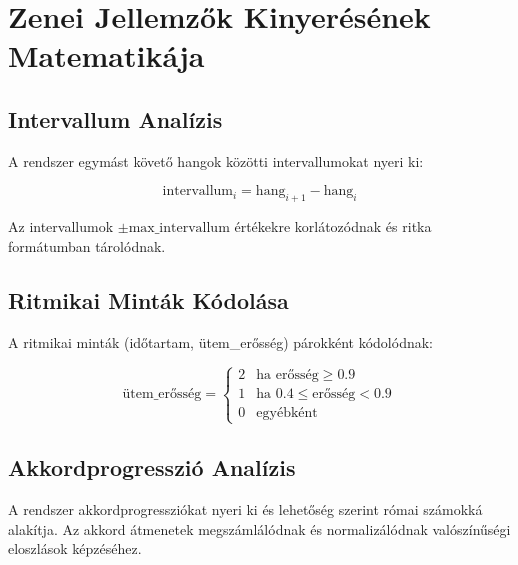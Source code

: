 \section{Zenei Jellemzők Kinyerésének Matematikája}

\subsection{Intervallum Analízis}

A rendszer egymást követő hangok közötti intervallumokat nyeri ki:

\begin{equation}
\text{intervallum}_i = \text{hang}_{i+1} - \text{hang}_i
\end{equation}

Az intervallumok $\pm \text{max\_intervallum}$ értékekre korlátozódnak és ritka formátumban tárolódnak.

\subsection{Ritmikai Minták Kódolása}

A ritmikai minták (időtartam, ütem_erősség) párokként kódolódnak:

\begin{equation}
\text{ütem\_erősség} = \begin{cases}
2 & \text{ha erősség} \geq 0.9 \\
1 & \text{ha } 0.4 \leq \text{erősség} < 0.9 \\
0 & \text{egyébként}
\end{cases}
\end{equation}

\subsection{Akkordprogresszió Analízis}

A rendszer akkordprogressziókat nyeri ki és lehetőség szerint római számokká alakítja. Az akkord átmenetek megszámlálódnak és normalizálódnak valószínűségi eloszlások képzéséhez.
